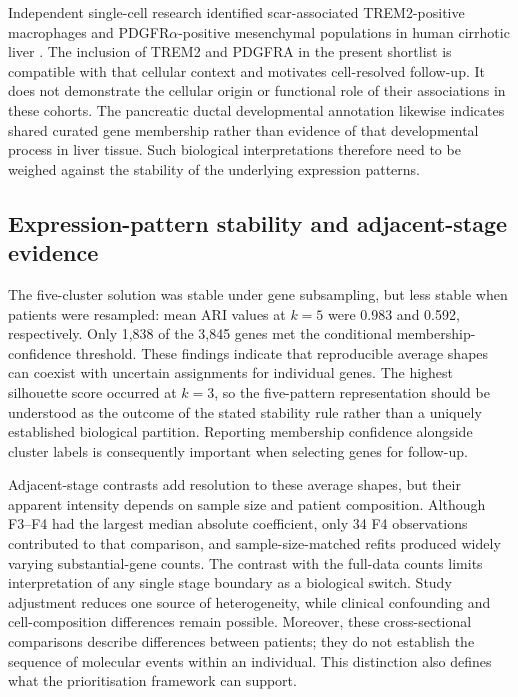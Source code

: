 \documentclass[11pt,a4paper]{article}
\begin{document}
Independent single-cell research identified scar-associated TREM2-positive macrophages and PDGFR\ensuremath{\alpha}-positive mesenchymal populations in human cirrhotic liver \cite{ref7}. The inclusion of TREM2 and PDGFRA in the present shortlist is compatible with that cellular context and motivates cell-resolved follow-up. It does not demonstrate the cellular origin or functional role of their associations in these cohorts. The pancreatic ductal developmental annotation likewise indicates shared curated gene membership rather than evidence of that developmental process in liver tissue. Such biological interpretations therefore need to be weighed against the stability of the underlying expression patterns.

\subsection*{Expression-pattern stability and adjacent-stage evidence}
The five-cluster solution was stable under gene subsampling, but less stable when patients were resampled: mean ARI values at \(k=5\) were 0.983 and 0.592, respectively. Only 1,838 of the 3,845 genes met the conditional membership-confidence threshold. These findings indicate that reproducible average shapes can coexist with uncertain assignments for individual genes. The highest silhouette score occurred at \(k=3\), so the five-pattern representation should be understood as the outcome of the stated stability rule rather than a uniquely established biological partition. Reporting membership confidence alongside cluster labels is consequently important when selecting genes for follow-up.

Adjacent-stage contrasts add resolution to these average shapes, but their apparent intensity depends on sample size and patient composition. Although F3--F4 had the largest median absolute coefficient, only 34 F4 observations contributed to that comparison, and sample-size-matched refits produced widely varying substantial-gene counts. The contrast with the full-data counts limits interpretation of any single stage boundary as a biological switch. Study adjustment reduces one source of heterogeneity, while clinical confounding and cell-composition differences remain possible. Moreover, these cross-sectional comparisons describe differences between patients; they do not establish the sequence of molecular events within an individual. This distinction also defines what the prioritisation framework can support.
\end{document}
